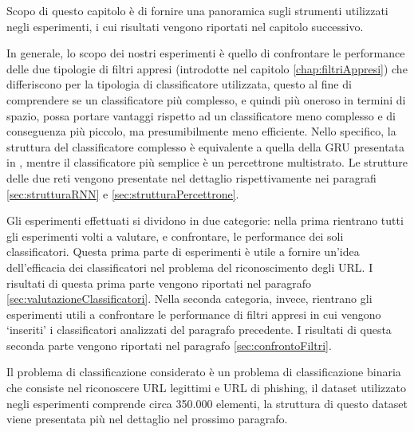 \documentclass[../../main.tex]{subfiles}
\begin{document}
    Scopo di questo capitolo è di fornire una panoramica sugli strumenti utilizzati negli esperimenti, i cui risultati vengono riportati nel capitolo successivo. 
    
    In generale, lo scopo dei nostri esperimenti è quello di confrontare le performance delle due tipologie di filtri appresi (introdotte nel capitolo \ref{chap:filtriAppresi}) che differiscono per la tipologia di classificatore utilizzata, questo al fine di comprendere se un classificatore più complesso, e quindi più oneroso in termini di spazio, possa portare vantaggi rispetto ad un classificatore meno complesso e di conseguenza più piccolo, ma presumibilmente meno efficiente. Nello specifico, la struttura del classificatore complesso è equivalente a quella della GRU presentata in \cite{ma2020}, mentre il classificatore più semplice è un percettrone multistrato. Le strutture delle due reti vengono presentate nel dettaglio rispettivamente nei paragrafi \ref{sec:strutturaRNN} e \ref{sec:strutturaPercettrone}.

    Gli esperimenti effettuati si dividono in due categorie: nella prima rientrano tutti gli esperimenti volti a valutare, e confrontare, le performance dei soli classificatori. Questa prima parte di esperimenti è utile a fornire un'idea dell'efficacia dei classificatori nel problema del riconoscimento degli URL. I risultati di questa prima parte vengono riportati nel paragrafo \ref{sec:valutazioneClassificatori}. Nella seconda categoria, invece, rientrano gli esperimenti utili a confrontare le performance di filtri appresi in cui vengono `inseriti' i classificatori analizzati del paragrafo precedente. I risultati di questa seconda parte vengono riportati nel paragrafo \ref{sec:confrontoFiltri}.

    Il problema di classificazione considerato è un problema di classificazione binaria che consiste nel riconoscere URL legittimi e URL di phishing, il dataset utilizzato negli esperimenti comprende circa 350.000 elementi, la struttura di questo dataset viene presentata più nel dettaglio nel prossimo paragrafo. 
\end{document}
